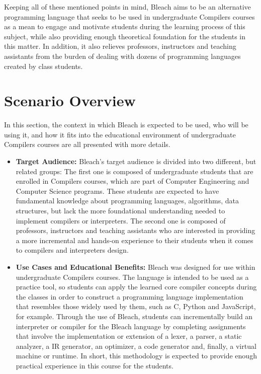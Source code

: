 Keeping all of these mentioned points in mind, Bleach aims to be an alternative programming language that seeks to be used in undergraduate Compilers courses as a mean to engage and motivate students during the learning process of this subject, while also providing enough theoretical foundation for the students in this matter. In addition, it also relieves professors, instructors and teaching assistants from the burden of dealing with dozens of programming languages created by class students.

\section{Scenario Overview}
In this section, the context in which Bleach is expected to be used, who will be using it, and how it fits into the educational environment of undergraduate Compilers courses are all presented with more details.

\begin{itemize}
    \item \textbf{Target Audience:} Bleach's target audience is divided into two different, but related groups: The first one is composed of undergraduate students that are enrolled in Compilers courses, which are part of Computer Engineering and Computer Science programs. These students are expected to have fundamental knowledge about programming languages, algorithms, data structures, but lack the more foundational understanding needed to implement compilers or interpreters. The second one is composed of professors, instructors and teaching assistants who are interested in providing a more incremental and hands-on experience to their students when it comes to compilers and interpreters design.
    
    \item \textbf{Use Cases and Educational Benefits:} Bleach was designed for use within undergraduate Compilers courses. The language is intended to be used as a practice tool, so students can apply the learned core compiler concepts during the classes in order to construct a programming language implementation that resembles those widely used by them, such as C, Python and JavaScript, for example. Through the use of Bleach, students can incrementally build an interpreter or compiler for the Bleach language by completing assignments that involve the implementation or extension of a lexer, a parser, a static analyzer, a IR generator, an optimizer, a code generator and, finally, a virtual machine or runtime. In short, this methodology is expected to provide enough practical experience in this course for the students.
    
\end{itemize}